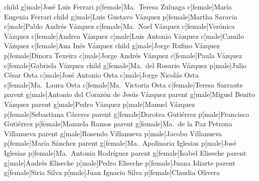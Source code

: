 \documentclass{standalone}
\begin{document}
\begin{genealogypicture}
{{{            child{%
                g[male]{José Luis Ferrari}
                p[female]{Ma.\ Teresa Zuluaga}
                c[female]{María Eugenia Ferrari}
            }
        }
        child{%
            g[male]{Luis Gustavo Vázquez}
            p[female]{Martha Saravia}
            c[male]{Pablo Andrés Vázquez}
            c[female]{Ma.\ Noel Vázquez}
            c[female]{Verónica Vázquez}
            c[female]{Andrea Vázquez}
            c[male]{Luis Antonio Vázquez}
            c[male]{Camilo Vázquez}
            c[female]{Ana Inés Vázquez}
        }
        child{%
            g[male]{Jorge Rufino Vázquez}
            p[female]{Dinora Texeira}
            c[male]{Jorge Andrés Vázquez}
            c[female]{Paula Vázquez}
            c[female]{Gabriela Vázquez}
        }
        child{%
            g[female]{Ma.\ del Rosario Vázquez}
            p[male]{Julio César Osta}
            c[male]{José Antonio Osta}
            c[male]{Jorge Nicolás Osta}
            c[female]{Ma.\ Laura Osta}
            c[female]{Ma.\ Victoria Osta}
            c[female]{Teresa Sarraute}
        }
    }
    parent{%
        g[male]{Antonio del Corazón de Jesús Vázquez}
        parent{%
            g[male]{Miguel Benito Vázquez}
            parent{%
                g[male]{Pedro Vázquez}
                p[male]{Manuel Vázquez}
                p[female]{Sebastiana Cáceres}
            }
            parent{%
                g[female]{Dorotea Gutiérrez}
                p[male]{Francisco Gutiérrez}
                p[female]{Manuela Ramos}
            }
        }
        parent{%
            g[female]{Ma.\ de la Paz Petrona Villanueva}
            parent{%
                g[male]{Rosendo Villanueva}
                p[male]{Jacobo Villanueva}
                p[female]{María Sánchez}
            }
            parent{%
                g[female]{Ma.\ Apolinaria Iglesias}
                p[male]{José Iglesias}
                p[female]{Ma.\ Antonia Rodríguez}
            }
        }
    }
    parent{%
        g[female]{Isabel Eliseche}
        parent{%
            g[male]{Andrés Eliseche}
            p[male]{Pedro Eliseche}
            p[female]{Juana Idiarte}
        }
        parent{%
            g[female]{Siria Silva}
            p[male]{Juan Ignacio Silva}
            p[female]{Claudia Olivera}
        }
    }
}

\end{genealogypicture}
\end{document}
